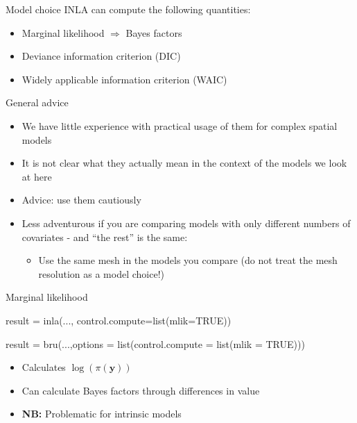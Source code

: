 \documentclass[
  ignorenonframetext,
]{beamer}
\newenvironment{Shaded}{\begin{snugshade}}{\end{snugshade}}
\newcommand{\AttributeTok}[1]{\textcolor[rgb]{0.77,0.63,0.00}{#1}}
\newcommand{\ConstantTok}[1]{\textcolor[rgb]{0.00,0.00,0.00}{#1}}
\newcommand{\FunctionTok}[1]{\textcolor[rgb]{0.00,0.00,0.00}{#1}}
\newcommand{\NormalTok}[1]{#1}
\newcommand{\OtherTok}[1]{\textcolor[rgb]{0.56,0.35,0.01}{#1}}
\providecommand{\tightlist}{%
  \setlength{\itemsep}{0pt}\setlength{\parskip}{0pt}}
\begin{document}
\begin{frame}{Model choice}
\protect\hypertarget{model-choice}{}
INLA can compute the following quantities:

\begin{itemize}
\item
  Marginal likelihood \(\Rightarrow\) Bayes factors
\item
  Deviance information criterion (DIC)
\item
  Widely applicable information criterion (WAIC)
\end{itemize}
\end{frame}

\begin{frame}{General advice}
\protect\hypertarget{general-advice}{}
\begin{itemize}
\item
  We have little experience with practical usage of them for complex
  spatial models
\item
  It is not clear what they actually mean in the context of the models
  we look at here
\item
  Advice: use them cautiously
\item
  Less adventurous if you are comparing models with only different
  numbers of covariates - and ``the rest'' is the same:

  \begin{itemize}
  \tightlist
  \item
    Use the same mesh in the models you compare (do not treat the mesh
    resolution as a model choice!)
  \end{itemize}
\end{itemize}
\end{frame}

\begin{frame}[fragile]{Marginal likelihood}
\protect\hypertarget{marginal-likelihood}{}
\small

\begin{Shaded}
\begin{Highlighting}[]
\NormalTok{result }\OtherTok{=} \FunctionTok{inla}\NormalTok{(...,}
              \AttributeTok{control.compute=}\FunctionTok{list}\NormalTok{(}\AttributeTok{mlik=}\ConstantTok{TRUE}\NormalTok{))}

\NormalTok{result }\OtherTok{=} \FunctionTok{bru}\NormalTok{(...,}\AttributeTok{options =} \FunctionTok{list}\NormalTok{(}\AttributeTok{control.compute =} 
                                  \FunctionTok{list}\NormalTok{(}\AttributeTok{mlik =} \ConstantTok{TRUE}\NormalTok{)))}
\end{Highlighting}
\end{Shaded}

\normalsize

\begin{itemize}
\item
  Calculates \(\log(\pi(\boldsymbol{y}))\)
\item
  Can calculate Bayes factors through differences in value
\item
  \textbf{NB:} Problematic for intrinsic models
\end{itemize}
\end{frame}
\end{document}
